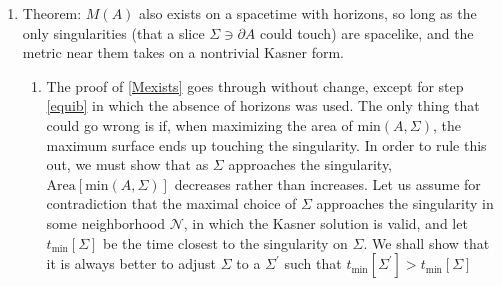 \documentclass[12pt]{article}
\begin{document}
\begin{enumerate}[resume]
\item\label{Kas} Theorem: $M(A)$ also exists on a spacetime with horizons, so long as the only singularities (that a slice $\Sigma \ni \partial A$ could touch) are spacelike, and the metric near them takes on a nontrivial Kasner form. 

	\begin{enumerate}
	\item The proof of \ref{Mexists} goes through without change, except for step \ref{equib} in which the absence of horizons was used.  The only thing that could go wrong is if, when maximizing the area of $\mathrm{min}(A,\Sigma)$, the maximum surface ends up touching the singularity.  In order to rule this out, we must show that as $\Sigma$ approaches the singularity, $\mathrm{Area}[\mathrm{min}(A,\Sigma)]$ decreases rather than increases.  Let us assume for contradiction that the maximal choice of $\Sigma$ approaches the singularity in some neighborhood $\mathcal{N}$, in which the Kasner solution is valid, and let $t_\mathrm{min}[\Sigma]$ be the time closest to the singularity on $\Sigma$.  We shall show that it is always better to adjust $\Sigma$ to a $\Sigma^\prime$ such that $t_\mathrm{min}[\Sigma^\prime] > t_\mathrm{min}[\Sigma]$


\end{enumerate}
\end{enumerate}
\end{document}
